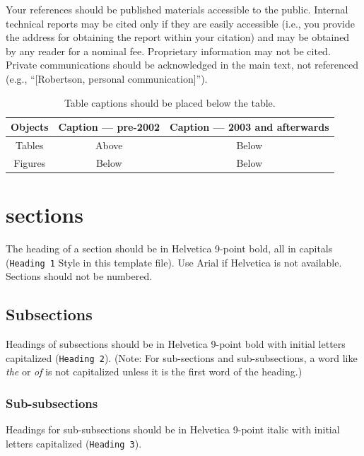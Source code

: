 \documentclass{chi2012}
\begin{document}
Your references should be published materials accessible to the
public.  Internal technical reports may be cited only if they are
easily accessible (i.e., you provide the address for obtaining the
report within your citation) and may be obtained by any reader for a
nominal fee.  Proprietary information may not be cited. Private
communications should be acknowledged in the main text, not referenced
(e.g., ``[Robertson, personal communication]'').

\begin{table}
  \begin{tabular}{|c|c|c|}
    \hline
    \bf Objects & 
    \multicolumn{1}{|p{0.3\columnwidth}|}{
      \raggedright \bf Caption --- pre-2002} &
    \multicolumn{1}{|p{0.4\columnwidth}|}{
      \raggedright \bf Caption --- 2003 and afterwards} \\
    \hline
    Tables & Above & Below \\
    \hline
    Figures & Below & Below \\
    \hline
  \end{tabular}
  \caption{Table captions should be placed below the table.}
  \label{tab:table1}
\end{table}

\section{sections}

The heading of a section should be in Helvetica 9-point bold, all in
capitals (\texttt{Heading 1} Style in this template file).  Use Arial
if Helvetica is not available. Sections should not be numbered.

\subsection{Subsections}

Headings of subsections should be in Helvetica 9-point bold with
initial letters capitalized (\texttt{Heading 2}). (Note: For
sub-sections and sub-subsections, a word like \emph{the} or \emph{of}
is not capitalized unless it is the first word of the heading.)

\subsubsection{Sub-subsections}

Headings for sub-subsections should be in Helvetica 9-point italic
with initial letters capitalized (\texttt{Heading 3}).
\end{document}
